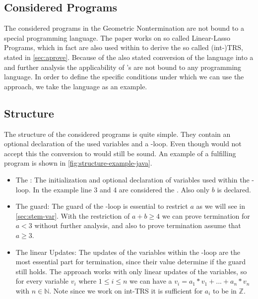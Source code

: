 \subsection{Considered Programs}
The considered programs in the Geometric Nontermination are not bound to a special programming language. The paper works on so called Linear-Lasso Programs, which in fact are also used within \aprove to derive the so called (int-)TRS, stated in \autoref{sec:aprove}. Because of the also stated conversion of the language into a \seg and further analysis the applicability of \gna's are not bound to any programming language. \newline
In order to define the specific conditions under which we can use the approach, we take the language  as an example.
\subsection{Structure}
\label{sec:structure}
The structure of the considered programs is quite simple. They contain an optional declaration of the used variables and a -loop. Even though  would not accept this the conversion to  would still be sound. An example of a fulfilling  program is shown in \autoref{fig:structure-example-java}. 
\begin{itemize}
	\item The \stem: \newline
		The initialization and optional declaration of variables used within the -loop. In the example line 3 and 4 are considered the \stem. Also only $b$ is declared.
	\item The guard: \newline
		The guard of the -loop is essential to restrict $a$  as we will see in \autoref{sec:stem-var}. With the restriction of $a+b\ge 4 $ we can prove termination for $a < 3$ without further analysis, and also to prove termination assume that $a \ge 3$.
	\item The linear Updates: \newline
		The updates of the variables within the -loop are the most essential part for termination, since their value determine if the guard still holds. The approach works with only linear updates of the variables, so for every variable $v_i$ where $1\le i\le n$ we can have a $v_i=a_1*v_1+...+a_n*v_n$ with $n \in \mathbb{N}$. Note since we work on int-TRS it is sufficient for $a_i$ to be in $\mathbb{Z}$. 	
\end{itemize} 

